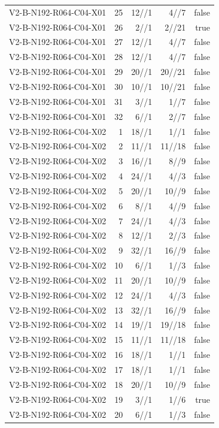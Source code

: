 {\begin{longtable}{lrrrr}
V2-B-N192-R064-C04-X01 & 25 & 12//1 & 4//7 & false \\
V2-B-N192-R064-C04-X01 & 26 & 2//1 & 2//21 & true \\
V2-B-N192-R064-C04-X01 & 27 & 12//1 & 4//7 & false \\
V2-B-N192-R064-C04-X01 & 28 & 12//1 & 4//7 & false \\
V2-B-N192-R064-C04-X01 & 29 & 20//1 & 20//21 & false \\
V2-B-N192-R064-C04-X01 & 30 & 10//1 & 10//21 & false \\
V2-B-N192-R064-C04-X01 & 31 & 3//1 & 1//7 & false \\
V2-B-N192-R064-C04-X01 & 32 & 6//1 & 2//7 & false \\
V2-B-N192-R064-C04-X02 & 1 & 18//1 & 1//1 & false \\
V2-B-N192-R064-C04-X02 & 2 & 11//1 & 11//18 & false \\
V2-B-N192-R064-C04-X02 & 3 & 16//1 & 8//9 & false \\
V2-B-N192-R064-C04-X02 & 4 & 24//1 & 4//3 & false \\
V2-B-N192-R064-C04-X02 & 5 & 20//1 & 10//9 & false \\
V2-B-N192-R064-C04-X02 & 6 & 8//1 & 4//9 & false \\
V2-B-N192-R064-C04-X02 & 7 & 24//1 & 4//3 & false \\
V2-B-N192-R064-C04-X02 & 8 & 12//1 & 2//3 & false \\
V2-B-N192-R064-C04-X02 & 9 & 32//1 & 16//9 & false \\
V2-B-N192-R064-C04-X02 & 10 & 6//1 & 1//3 & false \\
V2-B-N192-R064-C04-X02 & 11 & 20//1 & 10//9 & false \\
V2-B-N192-R064-C04-X02 & 12 & 24//1 & 4//3 & false \\
V2-B-N192-R064-C04-X02 & 13 & 32//1 & 16//9 & false \\
V2-B-N192-R064-C04-X02 & 14 & 19//1 & 19//18 & false \\
V2-B-N192-R064-C04-X02 & 15 & 11//1 & 11//18 & false \\
V2-B-N192-R064-C04-X02 & 16 & 18//1 & 1//1 & false \\
V2-B-N192-R064-C04-X02 & 17 & 18//1 & 1//1 & false \\
V2-B-N192-R064-C04-X02 & 18 & 20//1 & 10//9 & false \\
V2-B-N192-R064-C04-X02 & 19 & 3//1 & 1//6 & true \\
V2-B-N192-R064-C04-X02 & 20 & 6//1 & 1//3 & false \\

\end{longtable}}
